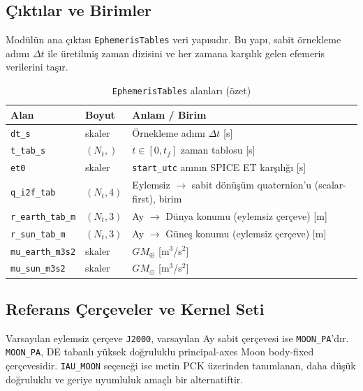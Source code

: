 \subsection*{Çıktılar ve Birimler}

Modülün ana çıktısı \texttt{EphemerisTables} veri yapısıdır.
Bu yapı, sabit örnekleme adımı $\Delta t$ ile üretilmiş zaman dizisini ve her zamana karşılık gelen efemeris verilerini taşır.

\begin{table}[H]
\centering
\caption{\texttt{EphemerisTables} alanları (özet)}
\label{tab:ephem_tables}
\begin{tabular}{lll}
\toprule
Alan & Boyut & Anlam / Birim \\
\midrule
\texttt{dt\_s} & skaler & Örnekleme adımı $\Delta t$ [s] \\
\texttt{t\_tab\_s} & $(N_t,)$ & $t \in [0,t_f]$ zaman tablosu [s] \\
\texttt{et0} & skaler & \texttt{start\_utc} anının SPICE ET karşılığı [s] \\
\texttt{q\_i2f\_tab} & $(N_t,4)$ & Eylemsiz $\rightarrow$ sabit dönüşüm quaternion’u (scalar-first), birim \\
\texttt{r\_earth\_tab\_m} & $(N_t,3)$ & Ay $\rightarrow$ Dünya konumu (eylemsiz çerçeve) [m] \\
\texttt{r\_sun\_tab\_m} & $(N_t,3)$ & Ay $\rightarrow$ Güneş konumu (eylemsiz çerçeve) [m] \\
\texttt{mu\_earth\_m3s2} & skaler & $GM_\oplus$ [m$^3$/s$^2$] \\
\texttt{mu\_sun\_m3s2} & skaler & $GM_\odot$ [m$^3$/s$^2$] \\
\bottomrule
\end{tabular}
\end{table}

\subsection*{Referans Çerçeveler ve Kernel Seti}

Varsayılan eylemsiz çerçeve \texttt{J2000},
varsayılan Ay sabit çerçevesi ise \texttt{MOON\_PA}’dır.
\texttt{MOON\_PA}, DE tabanlı yüksek doğruluklu
principal-axes Moon body-fixed çerçevesidir.
\texttt{IAU\_MOON} seçeneği ise metin PCK üzerinden tanımlanan,
daha düşük doğruluklu ve geriye uyumluluk amaçlı bir alternatiftir.

